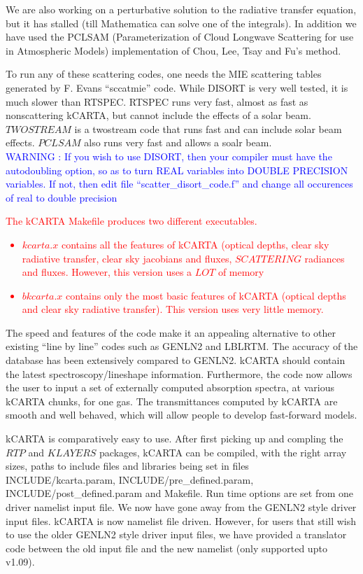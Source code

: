 \documentclass[12pt]{article}
\newcommand{\kc}{\textsf{kCARTA}\xspace}
\begin{document}
We are also working on a perturbative solution to the radiative transfer 
equation, but it has stalled (till Mathematica can solve one of the integrals).
In addition we have used the PCLSAM (Parameterization of Cloud Longwave 
Scattering for use in Atmospheric Models) implementation of Chou, Lee, Tsay 
and Fu's method.

To run any of these scattering  codes, one needs the MIE scattering tables 
generated by F. Evans ``sccatmie'' code. While DISORT is very well tested, it 
is much slower than RTSPEC. RTSPEC runs very fast, almost as fast as 
nonscattering kCARTA, but cannot include the effects of a solar beam. 
$TWOSTREAM$ is a twostream code that runs fast and can include solar beam 
effects. $PCLSAM$ also runs very fast and allows a soalr beam.\\
\textcolor{blue}
{WARNING : If you wish to use DISORT, then your compiler must have the 
autodoubling option, so as to turn REAL variables into DOUBLE PRECISION
variables. If not, then edit file ``scatter\_disort\_code.f'' and change all
occurences of real to double precision}

\textcolor{red}
{The \kc Makefile produces two different executables. 
\begin{itemize}
\item $kcarta.x$ contains all the features of kCARTA (optical depths, clear 
sky radiative transfer, clear sky jacobians and fluxes, $SCATTERING$ 
radiances and fluxes. However, this version uses a $LOT$ of memory
\item $bkcarta.x$ contains only the most basic features of kCARTA 
(optical depths and clear sky radiative transfer). This version uses 
very little memory.
\end{itemize}
}

The speed and features of the code make it an appealing alternative to other
existing ``line by line'' codes such as {\sf GENLN2} and {\sf LBLRTM}.
The accuracy of the database has been extensively compared to {\sf
  GENLN2}.  \kc should contain the latest spectroscopy/lineshape
information.  Furthermore, the code now allows the user to input a set
of externally computed absorption spectra, at various \kc chunks, for one 
gas. The transmittances computed by \kc are smooth and well behaved, which 
will allow people to develop fast-forward models.

\kc is comparatively easy to use. After first picking up and compling the 
$RTP$ and $KLAYERS$ packages, \kc can be compiled, with the right array sizes,
paths to include files and libraries being set in files 
{\sf INCLUDE/kcarta.param, INCLUDE/pre\_defined.param, 
INCLUDE/post\_defined.param  and Makefile}. 
Run time options are set from one driver namelist input file.  We now have 
gone away from the {\sf GENLN2} style driver input files.
\kc is now namelist file driven. However, for users that still wish to use 
the older {\sf GENLN2} style driver input files, we have provided a 
translator code between the old input file and the new namelist (only 
supported upto v1.09).
\end{document}
